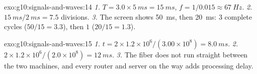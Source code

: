 \begin{solution}{exo:g10:signals-and-waves:14}
\emph{1.} $T = 3.0 \times \qty{5}{ms} = \qty{15}{ms}$,
$f = 1/0.015 \approx \qty{67}{Hz}$.
\emph{2.} $\qty{15}{ms}/\qty{2}{ms} = 7.5$ divisions.
\emph{3.} The screen shows \qty{50}{ms}, then \qty{20}{ms}: $3$ complete
cycles ($50/15 = 3.3$), then $1$ ($20/15 = 1.3$).
\end{solution}

\begin{solution}{exo:g10:signals-and-waves:15}
\emph{1.} $t = 2 \times 1.2\times10^{6}/(3.00\times10^{8}) =
\qty{8.0}{ms}$.
\emph{2.} $2 \times 1.2\times10^{6}/(2.0\times10^{8}) = \qty{12}{ms}$.
\emph{3.} The fiber does not run straight between the two machines, and
every router and server on the way adds processing delay.
\end{solution}

